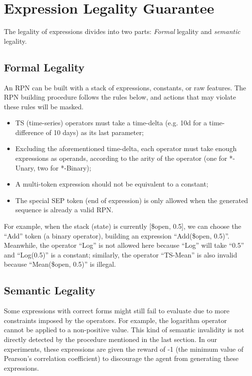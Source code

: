 \section{Expression Legality Guarantee} \label{sec:expr_legality}

The legality of expressions divides into two parts: \emph{Formal} legality and \emph{semantic} legality.

\subsection{Formal Legality}

An RPN can be built with a stack of expressions, constants, or raw features. The RPN building procedure follows the rules below, and actions that may violate these rules will be masked. 

\begin{itemize}
    \item TS (time-series) operators must take a time-delta (e.g. 10d for a time-difference of 10 days) as its last parameter;
    \item Excluding the aforementioned time-delta, each operator must take enough expressions as operands, according to the arity of the operator (one for *-Unary, two for *-Binary);
    \item A multi-token expression should not be equivalent to a constant;
    \item The special SEP token (end of expression) is only allowed when the generated sequence is already a valid RPN.
\end{itemize}

For example, when the stack (state) is currently [\$open, 0.5], we can choose the ``Add'' token (a binary operator), building an expression ``Add(\$open, 0.5)''. Meanwhile, the operator ``Log'' is not allowed here because ``Log'' will take ``0.5'' and ``Log(0.5)'' is a constant; similarly, the operator ``TS-Mean''
is also invalid because ``Mean(\$open, 0.5)'' is illegal.

\subsection{Semantic Legality}

Some expressions with correct forms might still fail to evaluate due to more constraints imposed by the operators. For example, the logarithm operator cannot be applied to a non-positive value. This kind of semantic invalidity is not directly detected by the procedure mentioned in the last section. In our experiments, these expressions are given the reward of -1 (the minimum value of Pearson's correlation coefficient) to discourage the agent from generating these expressions.

